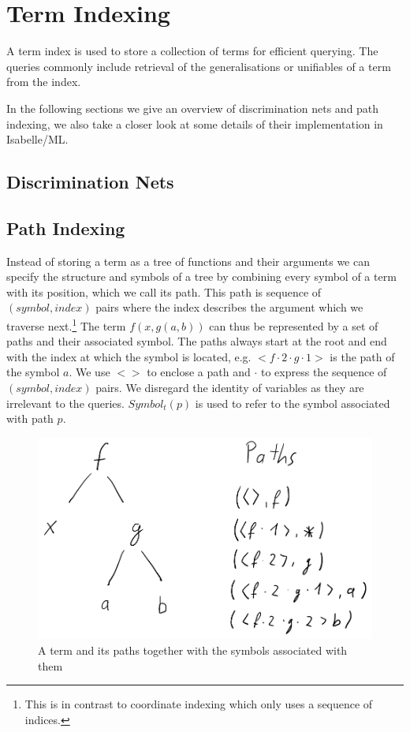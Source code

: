 \chapter{Term Indexing}
A term index is used to store a collection of terms for efficient querying. The queries commonly include retrieval of the generalisations or unifiables of a term from the index. 

In the following sections we give an overview of discrimination nets and path indexing, we also take a closer look at some details of their implementation in Isabelle/ML.

\section{Discrimination Nets}

\section{Path Indexing}
Instead of storing a term as a tree of functions and their arguments we can specify the structure and symbols of a tree by combining every symbol of a term with its position, which we call its path. This path is sequence of $(symbol, index)$ pairs where the index describes the argument which we traverse next.\footnote{This is in contrast to coordinate indexing which only uses a sequence of indices.} The term $f(x,g(a,b))$ can thus be represented by a set of paths and their associated symbol.
The paths always start at the root and end with the index at which the symbol is located, e.g. $<f \cdot 2 \cdot g \cdot 1>$ is the path of the symbol $a$. We use $<>$ to enclose a path and $\cdot$ to express the sequence of $(symbol, index)$ pairs.  We disregard the identity of variables as they are irrelevant to the queries. $Symbol_{t}(p)$ is used to refer to the symbol associated with path $p$.

\begin{figure}[h]
\centering
\includegraphics[scale=0.25]{figures/term_path.png}
\caption{A term and its paths together with the symbols associated with them}
\end{figure}

